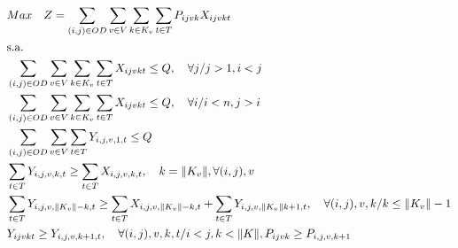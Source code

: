 \begin{align}
	 & Max \quad Z = \sum_{(i,j)\in OD} \sum_{v\in V} \sum_{k\in K_v} \sum_{t\in T} P_{ijvk} X_{ijvkt}                                                        \label{eq: m2_fo}                                                                                                  \\
	 & \text{s.a.}  \notag                                                                                                                                                                                                                                                       \\
	 & \sum_{(i,j)\in OD}\sum_{v\in V}\sum_{k\in K_v}\sum_{t\in T}X_{ijvkt} \leq Q , \quad \forall j / j>1, i<j                                               \label{eq: m2_cap_assig_destino}                                                                                   \\
	 & \sum_{(i,j)\in OD}\sum_{v\in V}\sum_{k\in K_v}\sum_{t\in T}X_{ijvkt} \leq Q , \quad \forall i / i<n, j>i                                                \label{eq: m2_cap_assig_origem}                                                                                   \\
	 & \sum_{(i,j) \in OD}\sum_{v\in V}\sum_{t\in T} Y_{i,j,v,1,t} \leq Q                                                                                     \label{eq: m2_cap_autho_1er_class}                                                                                 \\
	 & \sum_{t\in T} Y_{i,j,v,k,t} \geq  \sum_{t\in T} X_{i,j,v,k,t},  \quad k = \lVert K_v \rVert, \forall(i,j),v                                            \label{eq: m2_autho_mayor_assig_1er_class}                                                                         \\
	 & \sum_{t\in T} Y_{i,j,v,\lVert K_v \rVert - k,t} \geq  \sum_{t\in T} X_{i,j,v,\lVert K_v \rVert - k,t} + \sum_{t\in T} Y_{i,j,v,\lVert K_v \rVert k + 1,t} , \quad \forall(i,j),v, k / k \leq \lVert K_v\rVert - 1            \label{eq: m2_autho_mayor_assig_mas_autho-1} \\
	 & Y_{ijvkt} \geq Y_{i,j,v,k+1,t},  \quad \forall (i,j),v,k,t / i < j, k < \lVert K \rVert,  P_{ijvk} \geq P_{i,j,v,k+1}                                   \label{eq: m2_jerar_class}                                                                                        \\

\end{align}
